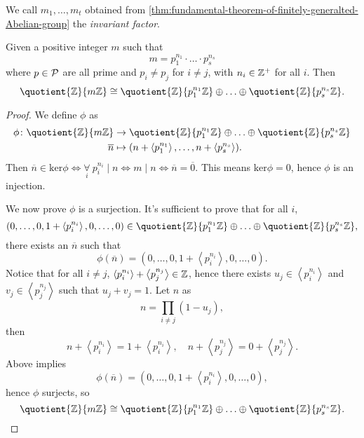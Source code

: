 \begin{definition}\label{def:invariant-factor}
	We call \(m_1, \ldots , m_t \) obtained from \autoref{thm:fundamental-theorem-of-finitely-generalted-Abelian-group} the \emph{invariant factor}.
\end{definition}

\begin{lemma}\label{lma:Chinese-remainder-theorem}
	Given a positive integer \(m\) such that
	\[
		m = p_1^{n_1}\cdot \ldots \cdot p_s^{n_s}
	\]
	where \(p\in \mathcal{\MakeUppercase{p}} \) are all prime and \(p_{i} \neq p_{j} \) for \(i\neq j\), with \(n_{i} \in \mathbb{\MakeUppercase{z}} ^+\) for all \(i\).
	Then
	\[
		\quotient{\mathbb{\MakeUppercase{z}}}{m\mathbb{\MakeUppercase{z}} } \cong \quotient{\mathbb{\MakeUppercase{z}} }{p_1^{n_1}\mathbb{\MakeUppercase{z}} } \oplus \ldots \oplus \quotient{\mathbb{\MakeUppercase{z}} }{p_s^{n_s}\mathbb{\MakeUppercase{z}} }.
	\]
\end{lemma}
\begin{proof}
	We define \(\phi\) as
	\[
		\begin{split}
			\phi \colon \quotient{\mathbb{\MakeUppercase{z}} }{m\mathbb{\MakeUppercase{z}} } &\to \quotient{\mathbb{\MakeUppercase{z}} }{p_1^{n_1}\mathbb{\MakeUppercase{z}} } \oplus \ldots \oplus \quotient{\mathbb{\MakeUppercase{z}} }{p_s^{n_s}\mathbb{\MakeUppercase{z}} }\\
			\overline{n} &\mapsto (n + \left< p_1^{n_1} \right>, \ldots , n + \left< p_s^{n_s} \right>  ).
		\end{split}
	\]
	Then \(\overline{n} \in \mathrm{ker} \phi \iff \underset{i}{\forall }\ p_i^{n_{i} }\mid n \iff m\mid n \iff \overline{n} = \overline{0}\). This means \(\mathrm{ker} \phi = 0\), hence \(\phi \) is an injection.

	We now prove \(\phi \) is a surjection. It's sufficient to prove that for all \(i\),
	\[
		(0, \ldots , 0, 1+ \left< p_i ^{n_{i} } \right>, 0, \ldots , 0)\in \quotient{\mathbb{\MakeUppercase{z}} }{p_1^{n_1}\mathbb{\MakeUppercase{z}} } \oplus \ldots \oplus \quotient{\mathbb{\MakeUppercase{z}} }{p_{s} ^{n_{s} }\mathbb{\MakeUppercase{z}} },
	\]
	there exists an \(\overline{n} \) such that
	\[
		\phi (\overline{n} ) = (0, \ldots , 0, 1+\left< p_{i} ^{n_{i}}\right>, 0, \ldots , 0).
	\]
	Notice that for all \(i\neq j\), \(\left< p_{i} ^{n_{i} } \right> + \left< p_{j} ^{n_{j} } \right> \in \mathbb{\MakeUppercase{z}}  \), hence there exists \(u_{j} \in \left< p_{i} ^{n_{i} } \right> \) and
	\(v_{j} \in \left< p_{j} ^{n_{j} } \right> \) such that \(u_{j} + v_{j} = 1\). Let \(n\) as
	\[
		n = \prod\limits_{i\neq j}(1 - u_{j} ),
	\]
	then
	\[
		n + \left< p_{i} ^{n_{i} } \right> = 1 + \left<  p_{i} ^{n_{i} }\right>,\quad n + \left< p_{j} ^{n_{j} } \right> = 0 + \left< p_{j} ^{n_{j} } \right>.
	\]
	Above implies
	\[
		\phi (\overline{n} ) = (0, \ldots , 0, 1 + \left< p_{i} ^{n_{i} } \right> , 0, \ldots , 0),
	\]
	hence \(\phi \) surjects, so
	\[
		\quotient{\mathbb{\MakeUppercase{z}}}{m\mathbb{\MakeUppercase{z}} } \cong \quotient{\mathbb{\MakeUppercase{z}} }{p_1^{n_1}\mathbb{\MakeUppercase{z}} } \oplus \ldots \oplus \quotient{\mathbb{\MakeUppercase{z}} }{p_s^{n_s}\mathbb{\MakeUppercase{z}} }.
	\]
\end{proof}


